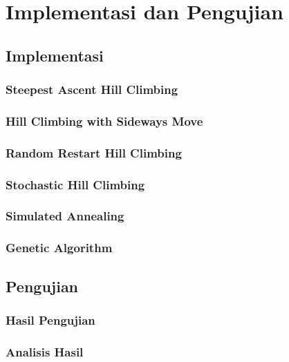 \chapter{Implementasi dan Pengujian}

\section{Implementasi}
\subsection{Steepest Ascent Hill Climbing}

\subsection{Hill Climbing with Sideways Move}

\subsection{Random Restart Hill Climbing}

\subsection{Stochastic Hill Climbing}

\subsection{Simulated Annealing}

\subsection{Genetic Algorithm}

\section{Pengujian}
\subsection{Hasil Pengujian}
\subsection{Analisis Hasil}